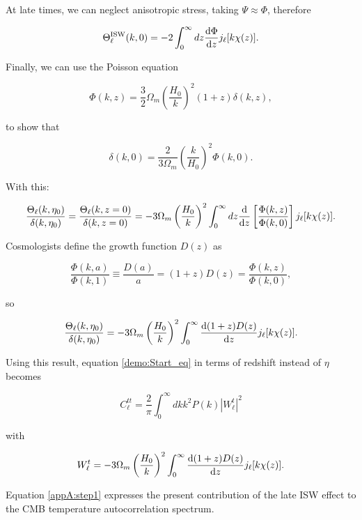 \documentclass[openany,a4paper,12pt,oneside]{book}
\begin{document}
\begin{spacing}{1.5}
At late times, we can neglect anisotropic stress, taking $\Psi\approx \Phi$, therefore

\begin{equation}
	\Theta_\ell^\text{ISW}(k,0)=-2\int_0^\infty dz \dv{\Phi}{z}j_\ell [k\chi(z)].
\end{equation}

Finally, we can use the Poisson equation

\begin{equation}
	\Phi(k,z)=\frac{3}{2}\Omega_m \left(\frac{H_0}{k}\right)^2(1+z)\delta(k,z),
\end{equation}

\noindent to show that

\begin{equation}
	\delta(k,0)=\frac{2}{3\Omega_m}\left(\frac{k}{H_0}\right)^2\Phi(k,0).
\end{equation}

With this:

\begin{equation}
	\frac{\Theta_\ell(k,\eta_0)}{\delta(k,\eta_0)}=\frac{\Theta_\ell(k,z=0)}{\delta(k,z=0)}=-3\Omega_m\left(\frac{H_0}{k}\right)^2\int_0^\infty dz \dv{}{z}\left[\frac{\Phi(k,z)}{\Phi(k,0)}\right]j_\ell[k\chi(z)].
\end{equation}

Cosmologists define the growth function $D(z)$ as

\begin{equation}
	\frac{\Phi(k,a)}{\Phi(k,1)}\equiv\frac{D(a)}{a}=(1+z)D(z)=\frac{\Phi(k,z)}{\Phi(k,0)},
\end{equation}

so

\begin{equation}
	\frac{\Theta_\ell(k,\eta_0)}{\delta(k,\eta_0)}=-3\Omega_m\left(\frac{H_0}{k}\right)^2\int_0^\infty \dv{(1+z)D(z)}{z}j_\ell[k\chi(z)].
\end{equation}

Using this result, equation \eqref{demo:Start_eq} in terms of redshift instead of $\eta$ becomes

\begin{equation}\label{AppA:eq_final}
	C_\ell^{tt}=\frac{2}{\pi}\int_0^\infty dk k^2P(k)|W_\ell^t|^2
\end{equation}

\noindent with 

\begin{equation}
	W_\ell^t=-3\Omega_m\left(\frac{H_0}{k}\right)^2\int_0^\infty \dv{(1+z)D(z)}{z}j_\ell[k\chi(z)].
\end{equation}

Equation \eqref{appA:step1} expresses the present contribution of the late ISW  effect to the CMB temperature autocorrelation spectrum.

\end{spacing}
\endgroup

\printbibliography
\end{document}

